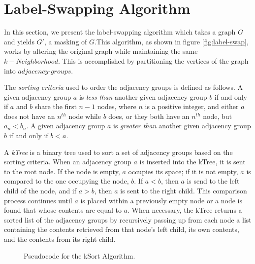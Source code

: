 \section{Label-Swapping Algorithm}
\indent In this section, we present the label-swapping algorithm which takes a graph $G$ and yields $G'$, a masking of $G$.This algorithm, as shown in figure \ref{fig:label-swap}, works by altering the original graph while maintaining the same $k-Neighborhood$. This is accomplished by partitioning the vertices of the graph into $adjacency$-$groups$.

\begin{definition}
	The \emph{sorting criteria} used to order the adjacency groups is defined as follows. A given adjacency group $a$ is \emph{less than} another given adjacency group $b$ if and only if $a$ and $b$ share the first $n - 1$ nodes, where $n$ is a positive integer, and either $a$ does not have an $n^{th}$ node while $b$ does, or they both have an $n^{th}$ node, but $a_n < b_n$. A given adjacency group $a$ is \emph{greater than} another given adjacency group $b$ if and only if $b < a$.
\end{definition}

\begin{definition}
	A \emph{kTree} is a binary tree used to sort a set of adjacency groups based on the sorting criteria. When an adjacency group $a$ is inserted into the kTree, it is sent to the root node. If the node is empty, $a$ occupies its space; if it is not empty, $a$ is compared to the one occupying the node, $b$. If $a < b$, then $a$ is send to the left child of the node, and if $a > b$, then $a$ is sent to the right child. This comparison process continues until $a$ is placed within a previously empty node or a node is found that whose contents are equal to $a$. When necessary, the kTree returns a sorted list of the adjacency groups by recursively passing up from each node a list containing the contents retrieved from that node's left child, its own contents, and the contents from its right child.
\end{definition}

\begin{figure}[H]
	\begin{algorithmic}
		\renewcommand{\algorithmicrequire}{\textbf{Input:}}
		\renewcommand{\algorithmicensure}{\textbf{Output:}}
		\EndFor
		\State {}
	\end{algorithmic}
	\caption{Pseudocode for the kSort Algorithm.}
	\label{fig:kSort}
\end{figure}

